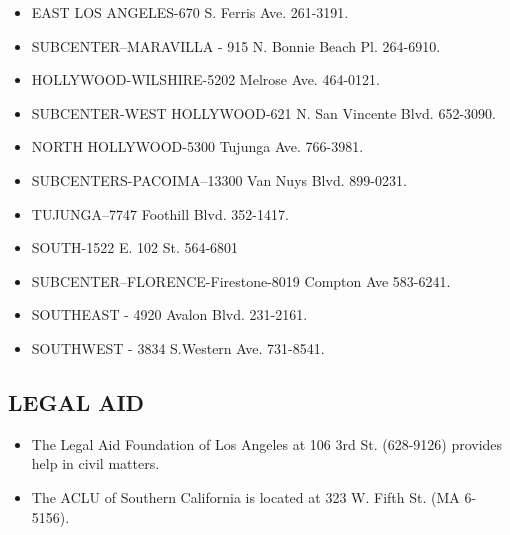 \documentclass[11pt,twoside,a4paper]{book}
\begin{document}
\begin{itemize}
	\item EAST LOS ANGELES-670 S. Ferris Ave. 261-3191.        
	\item SUBCENTER--MARAVILLA - 915 N. Bonnie Beach Pl. 264-6910.        
	\item HOLLYWOOD-WILSHIRE-5202 Melrose Ave. 464-0121.	
	\item SUBCENTER-WEST HOLLYWOOD-621 N. San Vincente Blvd. 652-3090.
	\item NORTH HOLLYWOOD-5300 Tujunga Ave. 766-3981.	
	\item SUBCENTERS-PACOIMA--13300 Van Nuys Blvd. 899-0231.        
	\item TUJUNGA--7747 Foothill Blvd. 352-1417.	
	\item SOUTH-1522 E. 102 St. 564-6801	
	\item SUBCENTER--FLORENCE-Firestone-8019 Compton Ave 583-6241.	
	\item SOUTHEAST - 4920 Avalon Blvd. 231-2161.	
	\item SOUTHWEST - 3834 S.Western Ave. 731-8541.	   
\end{itemize}

\subsection{LEGAL AID}
\begin{itemize}
\item The Legal Aid Foundation of Los Angeles at 106 3rd St. (628-9126) provides help in civil matters. 
\item The ACLU of Southern California is located at 323 W. Fifth St. (MA 6-5156).
\end{itemize}
\end{document}
